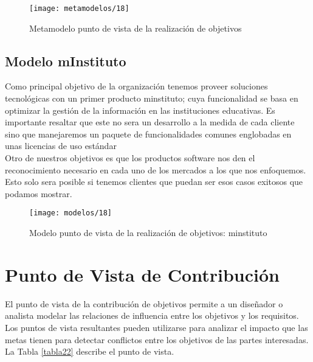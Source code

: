    \begin{figure}[H]
   	\centering
   	\texttt{[image: metamodelos/18]}
   	\captionsetup{width=.95\textwidth}
   	\caption{Metamodelo punto de vista de la realización de objetivos \cite{ref9}}
   	\label{metamodelo18}
   \end{figure}
   
   \subsection{Modelo mInstituto}
   Como principal objetivo de la organización tenemos proveer soluciones tecnológicas con un primer producto minstituto; cuya funcionalidad se basa en optimizar la gestión de la información en las instituciones educativas. Es importante resaltar que este no sera un desarrollo a la medida de cada cliente sino que manejaremos un paquete de funcionalidades comunes englobadas en unas licencias de uso estándar \\
   
   Otro de nuestros objetivos es que los productos software nos den el reconocimiento necesario en cada uno de los mercados a los que nos enfoquemos. Esto solo sera posible si tenemos clientes que puedan ser esos casos exitosos que podamos mostrar.

   \begin{figure}[H]
   	\centering
   	\texttt{[image: modelos/18]}
   	\captionsetup{width=.95\textwidth}
   	\caption{Modelo punto de vista de la realización de objetivos: minstituto}
   	\label{modelo18}
   \end{figure}
   
\section{Punto de Vista de Contribución}
El punto de vista de la contribución de objetivos permite a un diseñador o analista modelar las relaciones de influencia entre los objetivos y los requisitos. Los puntos de vista resultantes pueden utilizarse para analizar el impacto que las metas tienen para detectar conflictos entre los objetivos de las partes interesadas. La Tabla \ref{tabla22} describe el punto de vista. \cite{ref9}
   
